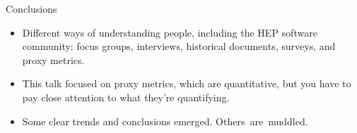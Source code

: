 \documentclass[aspectratio=169]{beamer}
\begin{document}
\begin{frame}{Conclusions}
\Large
\vspace{0.5 cm}
\begin{itemize}\setlength{\itemsep}{0.5 cm}
\item Different ways of understanding people, including the HEP software community: focus groups, interviews, historical documents, surveys, and proxy metrics.

\item This talk focused on proxy metrics, which are quantitative, but you have to pay close attention to what they're quantifying.

\item Some clear trends and conclusions emerged. \mbox{Others are muddled.\hspace{-1 cm}}
\end{itemize}
\end{frame}
\end{document}
